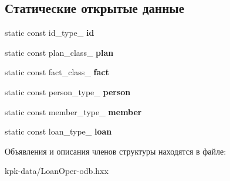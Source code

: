 \subsection*{Статические открытые данные}
\begin{DoxyCompactItemize}
\item 
static const id\+\_\+type\+\_\+ {\bfseries id}\hypertarget{structodb_1_1query__columns_3_01_1_1kpk_1_1data_1_1_loan_oper_00_01id__pgsql_00_01_a_01_4_abb9e1ec1720b0dc4feb8f7a0503eaf63}{}\label{structodb_1_1query__columns_3_01_1_1kpk_1_1data_1_1_loan_oper_00_01id__pgsql_00_01_a_01_4_abb9e1ec1720b0dc4feb8f7a0503eaf63}

\item 
static const plan\+\_\+class\+\_\+ {\bfseries plan}\hypertarget{structodb_1_1query__columns_3_01_1_1kpk_1_1data_1_1_loan_oper_00_01id__pgsql_00_01_a_01_4_ae075dc9ee33db24fbc2730c3c3a1cdd8}{}\label{structodb_1_1query__columns_3_01_1_1kpk_1_1data_1_1_loan_oper_00_01id__pgsql_00_01_a_01_4_ae075dc9ee33db24fbc2730c3c3a1cdd8}

\item 
static const fact\+\_\+class\+\_\+ {\bfseries fact}\hypertarget{structodb_1_1query__columns_3_01_1_1kpk_1_1data_1_1_loan_oper_00_01id__pgsql_00_01_a_01_4_a6d6df8fbb33959e1f7495af1e6a185cc}{}\label{structodb_1_1query__columns_3_01_1_1kpk_1_1data_1_1_loan_oper_00_01id__pgsql_00_01_a_01_4_a6d6df8fbb33959e1f7495af1e6a185cc}

\item 
static const person\+\_\+type\+\_\+ {\bfseries person}\hypertarget{structodb_1_1query__columns_3_01_1_1kpk_1_1data_1_1_loan_oper_00_01id__pgsql_00_01_a_01_4_a52a9286ab724fc5610ff1f4f9e5c013e}{}\label{structodb_1_1query__columns_3_01_1_1kpk_1_1data_1_1_loan_oper_00_01id__pgsql_00_01_a_01_4_a52a9286ab724fc5610ff1f4f9e5c013e}

\item 
static const member\+\_\+type\+\_\+ {\bfseries member}\hypertarget{structodb_1_1query__columns_3_01_1_1kpk_1_1data_1_1_loan_oper_00_01id__pgsql_00_01_a_01_4_a907d0dfb9378456bbb9f17f4c7d5b8df}{}\label{structodb_1_1query__columns_3_01_1_1kpk_1_1data_1_1_loan_oper_00_01id__pgsql_00_01_a_01_4_a907d0dfb9378456bbb9f17f4c7d5b8df}

\item 
static const loan\+\_\+type\+\_\+ {\bfseries loan}\hypertarget{structodb_1_1query__columns_3_01_1_1kpk_1_1data_1_1_loan_oper_00_01id__pgsql_00_01_a_01_4_ac7b4605a8307bfc399016be55bba9a18}{}\label{structodb_1_1query__columns_3_01_1_1kpk_1_1data_1_1_loan_oper_00_01id__pgsql_00_01_a_01_4_ac7b4605a8307bfc399016be55bba9a18}

\end{DoxyCompactItemize}


Объявления и описания членов структуры находятся в файле\+:\begin{DoxyCompactItemize}
\item 
kpk-\/data/Loan\+Oper-\/odb.\+hxx\end{DoxyCompactItemize}
